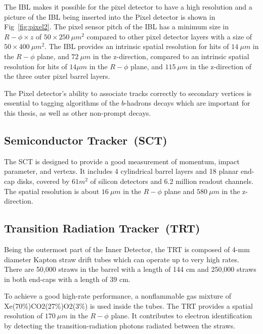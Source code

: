 \par The IBL makes it possible for the pixel detector to have a high resolution and a picture of the IBL being inserted into the Pixel detector is shown in 
Fig~\ref{fig:pixel2}. The pixel sensor pitch of the IBL has a minimum size in $R-\phi \times z$ of $50 \times 250~\mu m^2$ compared to other pixel detector layers with a size of $50 \times 400~\mu m^2$. 	 The IBL provides an intrinsic spatial resolution for hits of $14~\mu m$ in the $R-\phi$ plane, and
$72~\mu m$ in the z-direction, compared to an intrinsic spatial resolution for hits of $14\mu m$ in the $R-\phi$ plane, and $115~\mu m$ in the z-direction of the three outer pixel barrel layers.
\par The Pixel detector's ability to associate tracks correctly to secondary vertices is essential to tagging algorithms of the $b$-hadrons decays which are important for this thesis, as well as other non-prompt decays.
\subsection{Semiconductor Tracker~(SCT)}
The SCT \cite{AHMAD200798} is designed to provide a good measurement of momentum, impact parameter, and vertexs. It includes 4 cylindrical barrel layers and 18 planar end-cap disks, covered by $61 m^2$ of silicon detectors and 6.2 million readout channels. The spatial resolution is about $16~\mu m$ in the $R-\phi$ plane and $580~\mu m$ in the z-direction.

\subsection{Transition Radiation Tracker~(TRT)}

Being the outermost part of the Inner Detector, the TRT \cite{Abat:2008zza} is composed of 4-mm diameter Kapton straw drift tubes which can operate up to very high rates. There are 50,000 straws in the barrel with a length of 144 cm and 250,000 straws in both end-caps with a length of 39 cm.

To achieve a good high-rate performance, a nonflammable gas mixture of Xe(70\%)CO2(27\%)O2(3\%) is used inside the tubes. The TRT provides a spatial resolution of $170~\mu m$ in the $R-\phi$ plane. It contributes to electron identification by detecting the transition-radiation photons radiated between the straws. 

